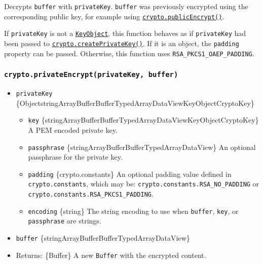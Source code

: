 Decrypts \texttt{buffer} with \texttt{privateKey}. \texttt{buffer} was
previously encrypted using the corresponding public key, for example
using
\hyperref[cryptopublicencryptkey-buffer]{\texttt{crypto.publicEncrypt()}}.

If \texttt{privateKey} is not a
\hyperref[class-keyobject]{\texttt{KeyObject}}, this function behaves as
if \texttt{privateKey} had been passed to
\hyperref[cryptocreateprivatekeykey]{\texttt{crypto.createPrivateKey()}}.
If it is an object, the \texttt{padding} property can be passed.
Otherwise, this function uses \texttt{RSA\_PKCS1\_OAEP\_PADDING}.

\subsubsection{\texorpdfstring{\texttt{crypto.privateEncrypt(privateKey,\ buffer)}}{crypto.privateEncrypt(privateKey, buffer)}}\label{crypto.privateencryptprivatekey-buffer}

\begin{itemize}
\tightlist
\item
  \texttt{privateKey}
  \{Object\textbar string\textbar ArrayBuffer\textbar Buffer\textbar TypedArray\textbar DataView\textbar KeyObject\textbar CryptoKey\}

  \begin{itemize}
  \tightlist
  \item
    \texttt{key}
    \{string\textbar ArrayBuffer\textbar Buffer\textbar TypedArray\textbar DataView\textbar KeyObject\textbar CryptoKey\}
    A PEM encoded private key.
  \item
    \texttt{passphrase}
    \{string\textbar ArrayBuffer\textbar Buffer\textbar TypedArray\textbar DataView\}
    An optional passphrase for the private key.
  \item
    \texttt{padding} \{crypto.constants\} An optional padding value
    defined in \texttt{crypto.constants}, which may be:
    \texttt{crypto.constants.RSA\_NO\_PADDING} or
    \texttt{crypto.constants.RSA\_PKCS1\_PADDING}.
  \item
    \texttt{encoding} \{string\} The string encoding to use when
    \texttt{buffer}, \texttt{key}, or \texttt{passphrase} are strings.
  \end{itemize}
\item
  \texttt{buffer}
  \{string\textbar ArrayBuffer\textbar Buffer\textbar TypedArray\textbar DataView\}
\item
  Returns: \{Buffer\} A new \texttt{Buffer} with the encrypted content.
\end{itemize}

